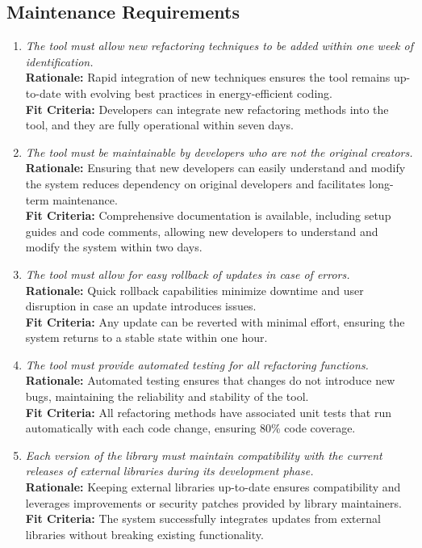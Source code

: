 \documentclass[12pt]{article}
\begin{document}
\subsection{Maintenance Requirements}
\begin{enumerate}[label=MS-MNT \arabic*., wide=0pt, leftmargin=*]
  \item \emph{The tool must allow new refactoring techniques to be added within one week of identification.}\\
  {\bf Rationale:} Rapid integration of new techniques ensures the tool remains up-to-date with evolving best practices in energy-efficient coding.\\
  {\bf Fit Criteria:} Developers can integrate new refactoring methods into the tool, and they are fully operational within seven days.
  
  \item \emph{The tool must be maintainable by developers who are not the original creators.}\\
  {\bf Rationale:} Ensuring that new developers can easily understand and modify the system reduces dependency on original developers and facilitates long-term maintenance.\\
  {\bf Fit Criteria:} Comprehensive documentation is available, including setup guides and code comments, allowing new developers to understand and modify the system within two days.
  
  \item \emph{The tool must allow for easy rollback of updates in case of errors.}\\
  {\bf Rationale:} Quick rollback capabilities minimize downtime and user disruption in case an update introduces issues.\\
  {\bf Fit Criteria:} Any update can be reverted with minimal effort, ensuring the system returns to a stable state within one hour.
  
  \item \emph{The tool must provide automated testing for all refactoring functions.}\\
  {\bf Rationale:} Automated testing ensures that changes do not introduce new bugs, maintaining the reliability and stability of the tool.\\
  {\bf Fit Criteria:} All refactoring methods have associated unit tests that run automatically with each code change, ensuring 80\% code coverage.
  
  \item \emph{Each version of the library must maintain compatibility with the current releases of external libraries during its development phase.}\\
  {\bf Rationale:} Keeping external libraries up-to-date ensures compatibility and leverages improvements or security patches provided by library maintainers.\\
  {\bf Fit Criteria:} The system successfully integrates updates from external libraries without breaking existing functionality.
\end{enumerate}
\end{document}
